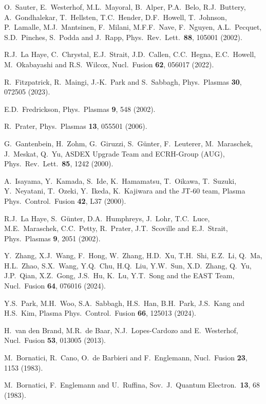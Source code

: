 \documentclass[12pt,prb,aps]{revtex4-1}
\begin{document}
\begin{thebibliography}{99}
 O.~Sauter, E.~Westerhof, M.L.~Mayoral, B.~Alper, P.A.~Belo, R.J.~Buttery, A.~Gondhalekar, T.~Hellsten, T.C.~Hender, 
D.F.~Howell, T.~Johnson, P.~Lamalle, M.J.~Mantsinen, F.~Milani, M.F.F.~Nave, F.~Nguyen, A.L.~Pecquet, S.D.~Pinches, S.~Podda and J.~Rapp,
Phys.\ Rev.\ Lett.\ {\bf 88}, 105001 (2002).

 R.J.~La Haye, C.~Chrystal, E.J.~Strait, J.D.~Callen, C.C.~Hegna, E.C.~Howell, M.~Okabayashi and R.S.~Wilcox, Nucl.\ Fusion {\bf 62}, 056017 (2022).

  R.~Fitzpatrick, R.~Maingi, J.-K.~Park and S.~Sabbagh, Phys.\ Plasmas {\bf 30}, 072505 (2023).

 E.D.~Fredrickson, Phys.\ Plasmas {\bf 9}, 548 (2002).

 R.~Prater, Phys.\ Plasmas {\bf 13}, 055501 (2006).

 G.~Gantenbein, H.~Zohm, G.~Giruzzi, S.~G\"{u}nter, F.~Leuterer, M.~Maraschek, J.~Meskat, Q.~Yu,  ASDEX Upgrade Team and ECRH-Group (AUG), 
Phys.\ Rev.\ Lett.\ {\bf 85}, 1242 (2000). 

 A.~Isayama, Y.~Kamada, S.~Ide, K.~Hamamatsu, T.~Oikawa, T.~Suzuki, Y.~Neyatani, T.~Ozeki, Y.~Ikeda, K.~Kajiwara and the JT-60 team,  
Plasma Phys.\  Control.\ Fusion {\bf 42}, L37 (2000).

 R.J.~La Haye,  S.~G\"{u}nter,  D.A.~Humphreys,  J.~Lohr,  T.C.~Luce,  M.E.~Maraschek,  C.C.~Petty, R.~Prater,  J.T.~Scoville and E.J.~Strait,
 Phys.\ Plasmas {\bf 9}, 2051 (2002).

 Y.~Zhang, X.J.~Wang, F.~Hong, W.~Zhang, H.D.~Xu, T.H.~Shi, E.Z.~Li, Q.~Ma, H.L.~Zhao, S.X.~Wang, Y.Q.~Chu, H.Q.~Liu, Y.W.~Sun, 
X.D.~Zhang, Q.~Yu, J.P.~Qian, X.Z.~Gong, J.S.~Hu, K.~Lu, Y.T.~Song and the EAST Team, 
 Nucl.\ Fusion {\bf 64},  076016 (2024).

 Y.S.~Park, M.H.~Woo, S.A.~Sabbagh, H.S.~Han, B.H.~Park, J.S.~Kang and H.S.~Kim,  Plasma Phys.\ Control.\ Fusion {\bf 66}, 125013 (2024).

 H.~van den Brand, M.R.~de Baar, N.J.~Lopes-Cardozo and E.~Westerhof, Nucl.\ Fusion {\bf 53}, 013005 (2013). 
  
 M.~Bornatici, R.~Cano, O.~de Barbieri and F.~Englemann, Nucl.\ Fusion {\bf 23}, 1153 (1983). 

 M.~Bornatici, F.~Englemann and U.~Ruffina, Sov.\ J.\ Quantum Electron.\ {\bf 13}, 68 (1983).


\end{thebibliography}
\end{document}
